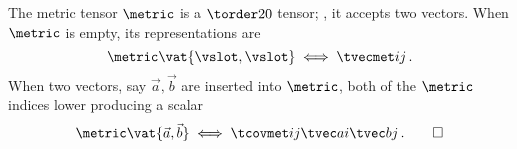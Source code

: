 \begin{example}
  The metric tensor $\metric$ is a $\torder 20$ tensor; \ie, it accepts two vectors. When $\metric$ is empty, its representations are
  \begin{equation*}
    \metric\vat{\vslot,\vslot}\iff\tvecmet ij\,.
  \end{equation*}
  When two vectors, say $\vec a,\vec b$ are inserted into $\metric$, both of the $\metric$ indices lower producing a scalar
  \begin{equation*}
    \metric\vat{\vec a, \vec b}\iff\tcovmet ij\tvec ai\tvec bj\,. \qed
  \end{equation*}
\end{example}

